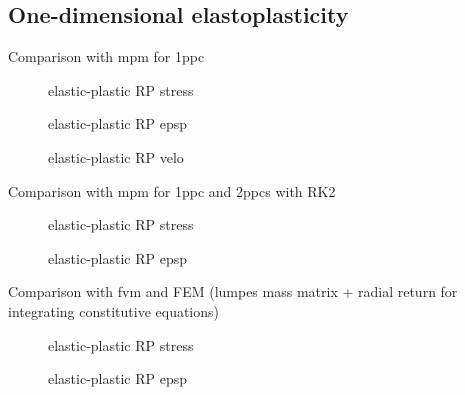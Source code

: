 \subsection{One-dimensional elastoplasticity}
Comparison with mpm for 1ppc
\begin{figure}[h!]
  \centering
  {}
  {}
  {}
  \caption{elastic-plastic RP stress}
  \label{fig:stress_elastoplastic_RP}
\end{figure}
\begin{figure}[h!]
  \centering
  {}
  {}
  {}
  \caption{elastic-plastic RP epsp}
  \label{fig:epsp_elastoplastic_RP}
\end{figure}
\begin{figure}[h!]
  \centering
  {}
  {}
  {}
  \caption{elastic-plastic RP velo}
  \label{fig:velo_elastoplastic_RP}
\end{figure}
Comparison with mpm for 1ppc and 2ppcs with RK2
\begin{figure}[h!]
  \centering
  {}
  {}
  {}
  \caption{elastic-plastic RP stress}
  \label{fig:stress_elastoplastic_RP}
\end{figure}
\begin{figure}[h!]
  \centering
  {}
  {}
  {}
  \caption{elastic-plastic RP epsp}
  \label{fig:epsp_elastoplastic_RP}
\end{figure}


Comparison with fvm and FEM (lumpes mass matrix + radial return for integrating constitutive equations)
\begin{figure}[h!]
  \centering
  {}
  {}
  {}
  \caption{elastic-plastic RP stress}
  \label{fig:stress_elastoplastic_RP}
\end{figure}
\begin{figure}[h!]
  \centering
  {}
  {}
  {}
  \caption{elastic-plastic RP epsp}
  \label{fig:epsp_elastoplastic_RP}
\end{figure}

